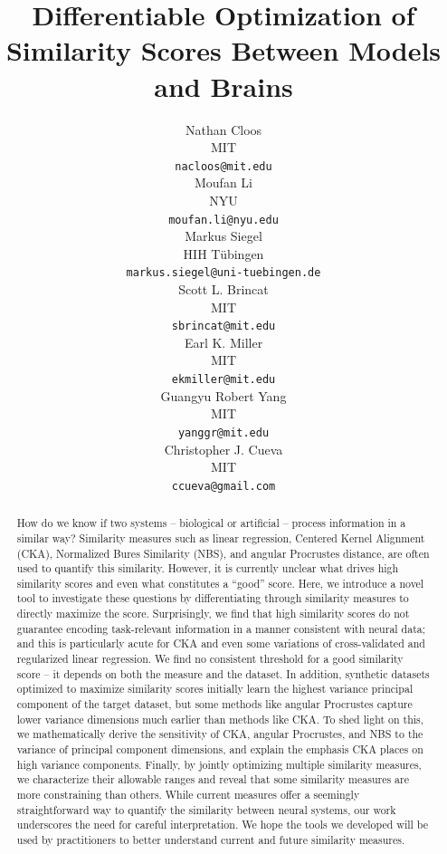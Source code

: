 \documentclass{article} %
\title{Differentiable Optimization of Similarity Scores Between Models and Brains}
\author{%
    Nathan Cloos \\
  MIT\\
  \texttt{nacloos@mit.edu} \\
  \And
  Moufan Li \\
  NYU \\
  \texttt{moufan.li@nyu.edu} \\
  \AND
  Markus Siegel \\
  HIH Tübingen \\
  \texttt{markus.siegel@uni-tuebingen.de} \\
  \And
  Scott L. Brincat \\
  MIT \\
  \texttt{sbrincat@mit.edu} \\
  \And
  Earl K. Miller \\
  MIT \\
  \texttt{ekmiller@mit.edu} \\  
  \And
  Guangyu Robert Yang \\
  MIT \\
  \texttt{yanggr@mit.edu} \\  
  \And
  Christopher J. Cueva \\
  MIT \\
  \texttt{ccueva@gmail.com} \\
}
\begin{document}
\maketitle


\begin{abstract}
How do we know if two systems – biological or artificial – process information in a similar way? Similarity measures such as linear regression, Centered Kernel Alignment (CKA), Normalized Bures Similarity (NBS), and angular Procrustes distance, are often used to quantify this similarity. However, it is currently unclear what drives high similarity scores and even what constitutes a “good” score. %
Here, we introduce a novel tool to investigate these questions by differentiating through similarity measures to directly maximize the score. 
Surprisingly, we find that high similarity scores do not guarantee encoding task-relevant information in a manner consistent with neural data; and this is particularly acute for CKA and even some variations of cross-validated and regularized linear regression. We find no consistent threshold %
for a good similarity score – it depends on both the measure and the dataset. In addition, synthetic datasets optimized to maximize similarity scores initially learn the highest variance principal component of the target dataset, but some methods like angular Procrustes capture lower variance dimensions much earlier than methods like CKA. To shed light on this, we mathematically derive the sensitivity of CKA, angular Procrustes, and NBS to the variance of principal component dimensions, and explain the emphasis CKA places on high variance components. %
Finally, by jointly optimizing multiple similarity measures, we characterize their allowable ranges and reveal that some similarity measures are more constraining than others. %
 While current measures offer a seemingly straightforward way to quantify the similarity between neural systems, our work underscores the need for careful interpretation. We hope the tools we developed will be used by practitioners to better understand current and future similarity measures.
\end{abstract}
\end{document}

